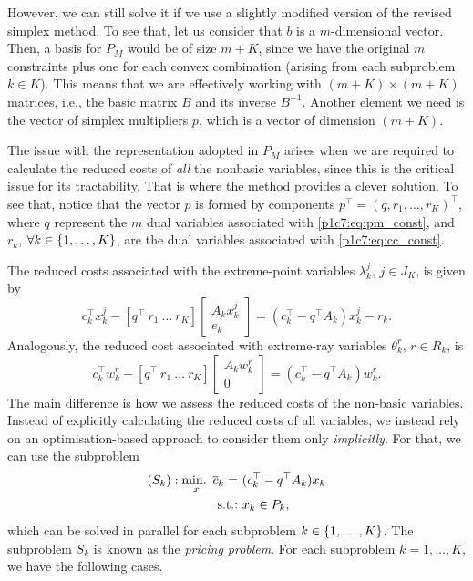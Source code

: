 However, we can still solve it if we use a slightly modified version of the revised simplex method. To see that, let us consider that $b$ is a $m$-dimensional vector. Then, a basis for $P_M$ would be of size $m + K$, since we have the original $m$ constraints plus one for each convex combination (arising from each subproblem $k \in K$). This means that we are effectively working with $(m + K) \times (m + K)$ matrices, i.e., the basic matrix $B$ and its inverse $B^{-1}$. Another element we need is the vector of simplex multipliers $p$, which is a vector of dimension $(m + K)$.

The issue with the representation adopted in $P_M$ arises when we are required to calculate the reduced costs of \emph{all} the nonbasic variables, since this is the critical issue for its tractability. That is where the method provides a clever solution. To see that, notice that the vector $p$ is formed by components $p^\top = (q, r_1, \dots, r_K)^\top$, where $q$ represent the $m$ dual variables associated with \eqref{p1c7:eq:pm_const}, and $r_k$, $\forall k \in \left\{ 1,\dots,K \right \}$, are the dual variables associated with \eqref{p1c7:eq:cc_const}. 

The reduced costs associated with the extreme-point variables $\lambda_k^j$, $j \in J_K$, is given by
%
\begin{equation}
	c_k^\top x_k^j - [q^\top ~ r_1 ~ \dots ~ r_K]	\begin{bmatrix} A_k x_k^j \\ e_k \end{bmatrix} = (c_k^\top - q^\top A_k)x_k^j - r_k.
\end{equation}
%
Analogously, the reduced cost associated with extreme-ray variables $\theta_k^r$, $r \in R_k$, is
\begin{equation}
	c_k^\top w_k^r - [q^\top ~ r_1 ~ \dots ~ r_K]	\begin{bmatrix} A_k w_k^r \\ 0 \end{bmatrix} = (c_k^\top - q^\top A_k)w_k^r.
\end{equation}
%
The main difference is how we assess the reduced costs of the non-basic variables. Instead of explicitly calculating the reduced costs of all variables, we instead rely on an optimisation-based approach to consider them only \emph{implicitly}. For that, we can use the subproblem 
%
\begin{align*}
	(S_k):  \mathop{\text{min.~}}_x \overline{c}_k = \ & (c_k^\top - q^\top A_k)x_k \\
	\mathop{\text{s.t.:~}} & x_k \in P_k,			
\end{align*} 
%
which can be solved in parallel for each subproblem $k \in \left\{ 1,\dots,K \right \}$. The subproblem $S_k$ is known as the \emph{pricing problem}. For each subproblem $k = 1, \dots, K$, we have the following cases.

